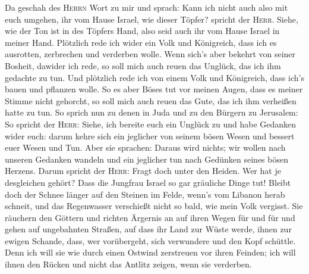  Da geschah des \textsc{Herrn} Wort zu mir und sprach:
 Kann ich nicht auch also mit euch umgehen, ihr vom Hause
Israel, wie dieser Töpfer? spricht der \textsc{Herr}. Siehe, wie der Ton
ist in des Töpfers Hand, also seid auch ihr vom Hause Israel in meiner
Hand.  Plötzlich rede ich wider ein Volk und Königreich,
dass ich es ausrotten, zerbrechen und verderben wolle. 
Wenn sich's aber bekehrt von seiner Bosheit, dawider ich rede, so soll
mich auch reuen das Unglück, das ich ihm gedachte zu tun. 
Und plötzlich rede ich von einem Volk und Königreich, dass ich's bauen
und pflanzen wolle.  So es aber Böses tut vor meinen
Augen, dass es meiner Stimme nicht gehorcht, so soll mich auch reuen das
Gute, das ich ihm verheißen hatte zu tun.  So sprich nun
zu denen in Juda und zu den Bürgern zu Jerusalem: So spricht der
\textsc{Herr}: Siehe, ich bereite euch ein Unglück zu und habe Gedanken
wider euch: darum kehre sich ein jeglicher von seinem bösen Wesen und
bessert euer Wesen und Tun.  Aber sie sprachen: Daraus
wird nichts; wir wollen nach unseren Gedanken wandeln und ein jeglicher
tun nach Gedünken seines bösen Herzens.  Darum spricht
der \textsc{Herr}: Fragt doch unter den Heiden. Wer hat je desgleichen
gehört? Dass die Jungfrau Israel so gar gräuliche Dinge tut!
 Bleibt doch der Schnee länger auf den Steinen im Felde,
wenn's vom Libanon herab schneit, und das Regenwasser verschießt nicht
so bald, wie mein Volk vergisst.  Sie räuchern den
Göttern und richten Ärgernis an auf ihren Wegen für und für und gehen
auf ungebahnten Straßen,  auf dass ihr Land zur Wüste
werde, ihnen zur ewigen Schande, dass, wer vorübergeht, sich verwundere
und den Kopf schüttle.  Denn ich will sie wie durch einen
Ostwind zerstreuen vor ihren Feinden; ich will ihnen den Rücken und
nicht das Antlitz zeigen, wenn sie verderben.

